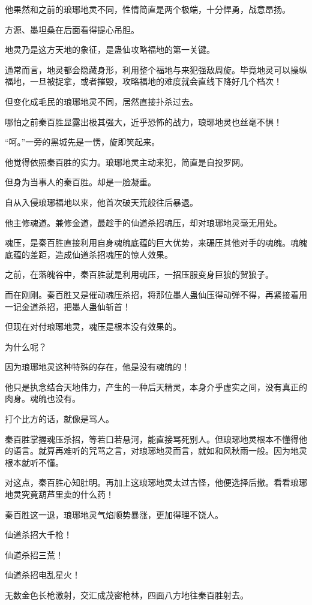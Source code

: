 \begin{this_body}
他果然和之前的琅琊地灵不同，性情简直是两个极端，十分悍勇，战意昂扬。

方源、墨坦桑在后面看得提心吊胆。

地灵乃是这方天地的象征，是蛊仙攻略福地的第一关键。

通常而言，地灵都会隐藏身形，利用整个福地与来犯强敌周旋。毕竟地灵可以操纵福地，一旦被捉拿，或者摧毁，攻略福地的难度就会直线下降好几个档次！

但变化成毛民的琅琊地灵不同，居然直接扑杀过去。

哪怕之前秦百胜显露出极其强大，近乎恐怖的战力，琅琊地灵也丝毫不惧！

“呵。”一旁的黑城先是一愣，旋即笑起来。

他觉得依照秦百胜的实力。琅琊地灵主动来犯，简直是自投罗网。

但身为当事人的秦百胜。却是一脸凝重。

自从入侵琅琊福地以来，他首次破天荒般往后暴退。

他主修魂道。兼修金道，最趁手的仙道杀招魂压，却对琅琊地灵毫无用处。

魂压，是秦百胜直接利用自身魂魄底蕴的巨大优势，来碾压其他对手的魂魄。魂魄底蕴的差距，造成仙道杀招魂压的惊人效果。

之前，在落魄谷中，秦百胜就是利用魂压，一招压服变身巨狼的贺狼子。

而在刚刚。秦百胜又是催动魂压杀招，将那位墨人蛊仙压得动弹不得，再紧接着用一记金道杀招，把墨人蛊仙斩首！

但现在对付琅琊地灵，魂压是根本没有效果的。

为什么呢？

因为琅琊地灵这种特殊的存在，他是没有魂魄的！

他只是执念结合天地伟力，产生的一种后天精灵，本身介乎虚实之间，没有真正的肉身。魂魄也没有。

打个比方的话，就像是骂人。

秦百胜掌握魂压杀招，等若口若悬河，能直接骂死别人。但琅琊地灵根本不懂得他的语言。就算再难听的咒骂之言，对琅琊地灵而言，就如和风秋雨一般。因为地灵根本就听不懂。

对这点，秦百胜心知肚明。再加上这琅琊地灵太过古怪，他便选择后撤。看看琅琊地灵究竟葫芦里卖的什么药！

秦百胜这一退，琅琊地灵气焰顺势暴涨，更加得理不饶人。

仙道杀招大千枪！

仙道杀招三荒！

仙道杀招电乱星火！

无数金色长枪激射，交汇成茂密枪林，四面八方地往秦百胜射去。


\end{this_body}
